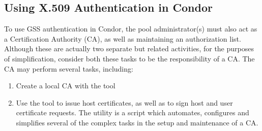 \subsection{\label{sec:Condor-X509-Authentication}Using X.509 Authentication
in Condor}

To use GSS authentication in Condor, the pool administrator(s) must also
act as a Certification Authority (CA), as well as maintaining an authorization
list. Although these are actually two separate but related activities, for
the purposes of simplification, consider both these tasks to be the 
responsibility of a CA. The CA may perform several tasks, including:
\begin{enumerate}
\item Create a local CA with the tool 
\item Use the tool  to issue host certificates, as well
as to sign host and user certificate requests. The  utility
is a script which automates, configures and simplifies several of the complex
tasks in the setup and maintenance of a CA. 
\end{enumerate}
